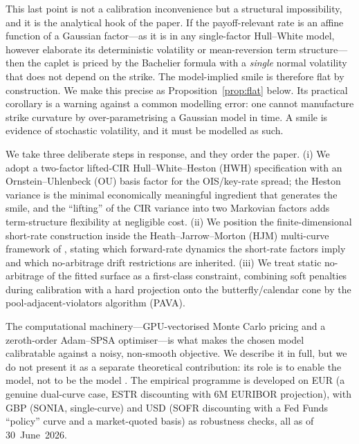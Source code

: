 \documentclass[11pt]{article}
\theoremstyle{plain}
\theoremstyle{definition}
\begin{document}
This last point is not a calibration inconvenience but a structural
impossibility, and it is the analytical hook of the paper. If the
payoff-relevant rate is an affine function of a Gaussian factor---as it is in
any single-factor Hull--White model, however elaborate its deterministic
volatility or mean-reversion term structure---then the caplet is priced by the
Bachelier formula with a \emph{single} normal volatility that does not depend on
the strike. The model-implied smile is therefore flat by construction. We make
this precise as Proposition~\ref{prop:flat} below. Its practical corollary is a
warning against a common modelling error: one cannot manufacture strike
curvature by over-parametrising a Gaussian model in time. A smile is evidence of
stochastic volatility, and it must be modelled as such.

We take three deliberate steps in response, and they order the paper. (i) We
adopt a two-factor lifted-CIR Hull--White--Heston (HWH) specification with an
Ornstein--Uhlenbeck (OU) basis factor for the OIS/key-rate spread; the Heston
variance is the minimal economically meaningful ingredient that generates the
smile, and the ``lifting'' of the CIR variance into two Markovian factors
\citep{AbiJaber2019} adds term-structure flexibility at negligible cost. (ii) We
position the finite-dimensional short-rate construction inside the
Heath--Jarrow--Morton (HJM) multi-curve framework of
\citet{CFG2016,CFG2019}, stating which forward-rate dynamics the short-rate
factors imply and which no-arbitrage drift restrictions are inherited. (iii) We
treat static no-arbitrage of the fitted surface as a first-class constraint,
combining soft penalties during calibration with a hard projection onto the
butterfly/calendar cone by the pool-adjacent-violators algorithm (PAVA).

The computational machinery---GPU-vectorised Monte Carlo pricing and a
zeroth-order Adam--SPSA optimiser---is what makes the chosen model calibratable
against a noisy, non-smooth objective. We describe it in full, but we do not
present it as a separate theoretical contribution: its role is to enable the
model, not to be the model \citep{Savine2020,CapriottiGiles2024}. The empirical
programme is developed on EUR (a genuine dual-curve case, ESTR discounting with
6M EURIBOR projection), with GBP (SONIA, single-curve) and USD (SOFR discounting
with a Fed Funds ``policy'' curve and a market-quoted basis) as robustness
checks, all as of 30~June~2026.

\end{document}
